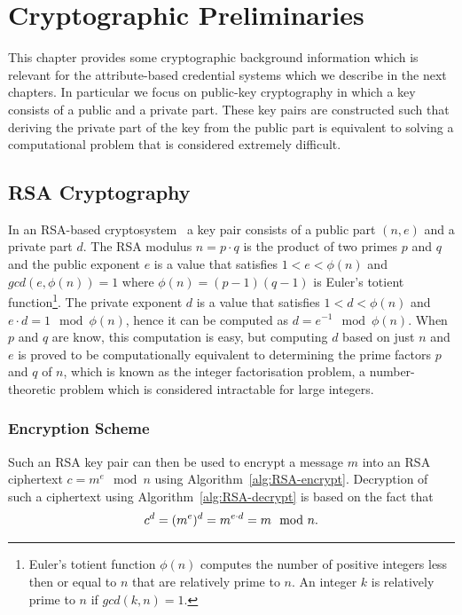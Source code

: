 \chapter{Cryptographic Preliminaries}

This chapter provides some cryptographic background information which is
relevant for the attribute-based credential systems which we describe in the
next chapters. In particular we focus on public-key cryptography in which a key
consists of a public and a private part. These key pairs are constructed such
that deriving the private part of the key from the public part is equivalent to
solving a computational problem that is considered extremely difficult.

\section{RSA Cryptography}

In an RSA-based cryptosystem~\cite{RSA1978} a key pair consists of a public part
$(n, e)$ and a private part $d$. The RSA modulus $n = p \cdot q$ is the product
of two primes $p$ and $q$ and the public exponent $e$ is a value that satisfies
$1 < e < \phi(n)$ and $gcd(e, \phi(n)) = 1$ where $\phi(n) = (p-1)(q-1)$ is
Euler's totient function\footnote{Euler's totient function $\phi(n)$ computes
the number of positive integers less then or equal to $n$ that are relatively
prime to $n$. An integer $k$ is relatively prime to $n$ if $gcd(k, n) = 1$.}.
The private exponent $d$ is a value that satisfies $1 < d < \phi(n)$ and
$e \cdot d = 1 \mod \phi(n)$, hence it can be computed as
$d = e^{-1} \mod \phi(n)$. When $p$ and $q$ are know, this computation is easy,
but computing $d$ based on just $n$ and $e$ is proved to be computationally
equivalent to determining the prime factors $p$ and $q$ of $n$, which is known
as the integer factorisation problem, a number-theoretic problem which is
considered intractable for large integers.

\subsection{Encryption Scheme}

Such an RSA key pair can then be used to encrypt a message $m$ into an RSA
ciphertext $c = m^e \mod n$ using Algorithm~\ref{alg:RSA-encrypt}. Decryption
of such a ciphertext using Algorithm~\ref{alg:RSA-decrypt} is based on the fact
that
\begin{equation*}
  c^d = (m^e)^d = m^{e \cdot d} = m \mod n\text.
\end{equation*}

